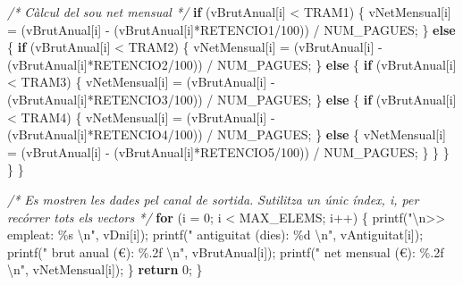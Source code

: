 \documentclass[
]{book}
\newenvironment{Shaded}{\begin{snugshade}}{\end{snugshade}}
\newcommand{\CommentTok}[1]{\textcolor[rgb]{0.56,0.35,0.01}{\textit{#1}}}
\newcommand{\ControlFlowTok}[1]{\textcolor[rgb]{0.13,0.29,0.53}{\textbf{#1}}}
\newcommand{\DecValTok}[1]{\textcolor[rgb]{0.00,0.00,0.81}{#1}}
\newcommand{\NormalTok}[1]{#1}
\newcommand{\SpecialCharTok}[1]{\textcolor[rgb]{0.00,0.00,0.00}{#1}}
\newcommand{\StringTok}[1]{\textcolor[rgb]{0.31,0.60,0.02}{#1}}
\begin{document}
\begin{Shaded}
\begin{Highlighting}[]
        \CommentTok{/* Càlcul del sou net mensual */}
        \ControlFlowTok{if}\NormalTok{ (vBrutAnual[i] \textless{} TRAM1) \{}
\NormalTok{            vNetMensual[i] = (vBrutAnual[i] {-} (vBrutAnual[i]*RETENCIO1/}\DecValTok{100}\NormalTok{)) / NUM\_PAGUES;}
\NormalTok{        \} }\ControlFlowTok{else}\NormalTok{ \{}
            \ControlFlowTok{if}\NormalTok{ (vBrutAnual[i] \textless{} TRAM2) \{}
\NormalTok{                vNetMensual[i] = (vBrutAnual[i] {-} (vBrutAnual[i]*RETENCIO2/}\DecValTok{100}\NormalTok{)) / NUM\_PAGUES;}
\NormalTok{            \} }\ControlFlowTok{else}\NormalTok{ \{}
                \ControlFlowTok{if}\NormalTok{ (vBrutAnual[i] \textless{} TRAM3) \{}
\NormalTok{                    vNetMensual[i] = (vBrutAnual[i] {-} (vBrutAnual[i]*RETENCIO3/}\DecValTok{100}\NormalTok{)) / NUM\_PAGUES;}
\NormalTok{                \} }\ControlFlowTok{else}\NormalTok{ \{}
                    \ControlFlowTok{if}\NormalTok{ (vBrutAnual[i] \textless{} TRAM4) \{}
\NormalTok{                        vNetMensual[i] = (vBrutAnual[i] {-} (vBrutAnual[i]*RETENCIO4/}\DecValTok{100}\NormalTok{)) / NUM\_PAGUES;}
\NormalTok{                    \} }\ControlFlowTok{else}\NormalTok{ \{}
\NormalTok{                        vNetMensual[i] = (vBrutAnual[i] {-} (vBrutAnual[i]*RETENCIO5/}\DecValTok{100}\NormalTok{)) / NUM\_PAGUES;}
\NormalTok{                    \}}
\NormalTok{                \}}
\NormalTok{            \}}
\NormalTok{        \}}
\NormalTok{    \}}
    
    \CommentTok{/* Es mostren les dades pel canal de sortida.}
\CommentTok{       S\textquotesingle{}utilitza un únic índex, i, per recórrer tots els vectors */}
    \ControlFlowTok{for}\NormalTok{ (i = }\DecValTok{0}\NormalTok{; i \textless{} MAX\_ELEMS; i++) \{}
\NormalTok{        printf(}\StringTok{"}\SpecialCharTok{\textbackslash{}n}\StringTok{\textgreater{}\textgreater{} empleat: \%s }\SpecialCharTok{\textbackslash{}n}\StringTok{"}\NormalTok{, vDni[i]);}
\NormalTok{        printf(}\StringTok{"   antiguitat (dies): \%d }\SpecialCharTok{\textbackslash{}n}\StringTok{"}\NormalTok{, vAntiguitat[i]);}
\NormalTok{        printf(}\StringTok{"   brut anual (€): \%.2f }\SpecialCharTok{\textbackslash{}n}\StringTok{"}\NormalTok{, vBrutAnual[i]);}
\NormalTok{        printf(}\StringTok{"   net mensual (€): \%.2f }\SpecialCharTok{\textbackslash{}n}\StringTok{"}\NormalTok{, vNetMensual[i]);}
\NormalTok{    \}}
    \ControlFlowTok{return} \DecValTok{0}\NormalTok{;}
\NormalTok{\}}
\end{Highlighting}
\end{Shaded}
\end{document}

